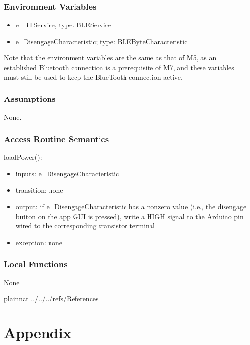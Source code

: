 \documentclass[12pt, titlepage]{article}
\begin{document}

\subsubsection{Environment Variables}

\begin{itemize}
\item e\_BTService, type: BLEService
\item e\_DisengageCharacteristic; type: BLEByteCharacteristic
\end{itemize}

Note that the environment variables are the same as that of M5, as an established Bluetooth connection is a prerequisite of M7, and these variables must still be used to keep the BlueTooth connection active. 

\subsubsection{Assumptions}

None. 

\subsubsection{Access Routine Semantics}

\noindent loadPower():
\begin{itemize}
\item inputs: e\_DisengageCharacteristic
\item transition: none 
\item output: if e\_DisengageCharacteristic has a nonzero value (i.e., the disengage button on the app GUI is pressed), write a HIGH signal to the Arduino pin wired to the corresponding transistor terminal
\item exception: none 
\end{itemize}

\subsubsection{Local Functions}

None



\newpage

 {plainnat}
 {../../../refs/References}

\newpage

\section{Appendix} \label{Appendix}

\end{document}
